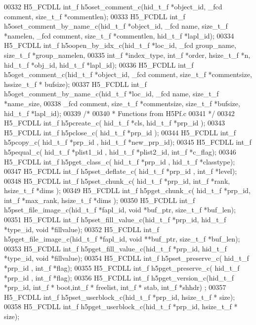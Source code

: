\begin{DoxyCode}
00332 H5\_FCDLL int\_f h5oset\_comment\_c(hid\_t\_f *object\_id, \_fcd comment, size\_t\_f *commentlen);
00333 H5\_FCDLL int\_f h5oset\_comment\_by\_name\_c(hid\_t\_f *object\_id, \_fcd name, size\_t\_f *namelen,  \_fcd comment, 
      size\_t\_f *commentlen, hid\_t\_f *lapl\_id);
00334 H5\_FCDLL int\_f h5oopen\_by\_idx\_c(hid\_t\_f *loc\_id, \_fcd  group\_name, size\_t\_f *group\_namelen, 
00335                       int\_f *index\_type, int\_f *order, hsize\_t\_f *n, hid\_t\_f *obj\_id, hid\_t\_f *lapl\_id);
00336 H5\_FCDLL int\_f h5oget\_comment\_c(hid\_t\_f *object\_id, \_fcd comment, size\_t\_f *commentsize, hssize\_t\_f *
      bufsize);
00337 H5\_FCDLL int\_f h5oget\_comment\_by\_name\_c(hid\_t\_f *loc\_id, \_fcd name, size\_t\_f *name\_size, 
00338                       \_fcd comment, size\_t\_f *commentsize, size\_t\_f *bufsize, hid\_t\_f *lapl\_id);
00339 \textcolor{comment}{/*}
00340 \textcolor{comment}{ * Functions from H5Pf.c}
00341 \textcolor{comment}{ */}
00342 H5\_FCDLL int\_f h5pcreate\_c( hid\_t\_f *cls, hid\_t\_f *prp\_id );
00343 H5\_FCDLL int\_f h5pclose\_c( hid\_t\_f *prp\_id );
00344 H5\_FCDLL int\_f h5pcopy\_c( hid\_t\_f *prp\_id , hid\_t\_f *new\_prp\_id);
00345 H5\_FCDLL int\_f h5pequal\_c( hid\_t\_f *plist1\_id , hid\_t\_f *plist2\_id, int\_f *c\_flag);
00346 H5\_FCDLL int\_f h5pget\_class\_c( hid\_t\_f *prp\_id , hid\_t\_f *classtype);
00347 H5\_FCDLL int\_f h5pset\_deflate\_c( hid\_t\_f *prp\_id , int\_f *level);
00348 H5\_FCDLL int\_f h5pset\_chunk\_c( hid\_t\_f *prp\_id, int\_f *rank, hsize\_t\_f *dims );
00349 H5\_FCDLL int\_f h5pget\_chunk\_c( hid\_t\_f *prp\_id, int\_f *max\_rank, hsize\_t\_f *dims );
00350 H5\_FCDLL int\_f h5pset\_file\_image\_c(hid\_t\_f *fapl\_id, \textcolor{keywordtype}{void} *buf\_ptr, size\_t\_f *buf\_len);
00351 H5\_FCDLL int\_f h5pset\_fill\_value\_c(hid\_t\_f *prp\_id, hid\_t\_f *type\_id, \textcolor{keywordtype}{void} *fillvalue);
00352 H5\_FCDLL int\_f h5pget\_file\_image\_c(hid\_t\_f *fapl\_id, \textcolor{keywordtype}{void} **buf\_ptr, size\_t\_f *buf\_len);
00353 H5\_FCDLL int\_f h5pget\_fill\_value\_c(hid\_t\_f *prp\_id, hid\_t\_f *type\_id, \textcolor{keywordtype}{void} *fillvalue);
00354 H5\_FCDLL int\_f h5pset\_preserve\_c( hid\_t\_f *prp\_id , int\_f *flag);
00355 H5\_FCDLL int\_f h5pget\_preserve\_c( hid\_t\_f *prp\_id , int\_f *flag);
00356 H5\_FCDLL int\_f h5pget\_version\_c(hid\_t\_f *prp\_id, int\_f * boot,int\_f * freelist, int\_f * stab, int\_f *shhdr)
      ;
00357 H5\_FCDLL int\_f h5pset\_userblock\_c(hid\_t\_f *prp\_id, hsize\_t\_f * size);
00358 H5\_FCDLL int\_f h5pget\_userblock\_c(hid\_t\_f *prp\_id, hsize\_t\_f * size);

\end{DoxyCode}
